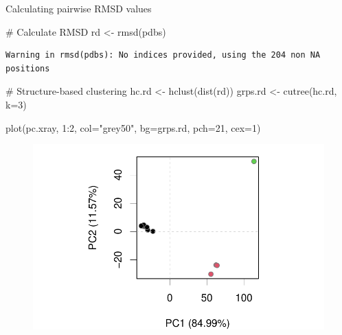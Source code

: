 \documentclass[
  letterpaper,
  DIV=11,
  numbers=noendperiod]{scrartcl}
\newenvironment{Shaded}{\begin{snugshade}}{\end{snugshade}}
\newcommand{\AttributeTok}[1]{\textcolor[rgb]{0.40,0.45,0.13}{#1}}
\newcommand{\CommentTok}[1]{\textcolor[rgb]{0.37,0.37,0.37}{#1}}
\newcommand{\DecValTok}[1]{\textcolor[rgb]{0.68,0.00,0.00}{#1}}
\newcommand{\FunctionTok}[1]{\textcolor[rgb]{0.28,0.35,0.67}{#1}}
\newcommand{\NormalTok}[1]{\textcolor[rgb]{0.00,0.23,0.31}{#1}}
\newcommand{\OtherTok}[1]{\textcolor[rgb]{0.00,0.23,0.31}{#1}}
\newcommand{\SpecialCharTok}[1]{\textcolor[rgb]{0.37,0.37,0.37}{#1}}
\newcommand{\StringTok}[1]{\textcolor[rgb]{0.13,0.47,0.30}{#1}}
\begin{document}
Calculating pairwise RMSD values

\begin{Shaded}
\begin{Highlighting}[]
\CommentTok{\# Calculate RMSD}
\NormalTok{rd }\OtherTok{\textless{}{-}} \FunctionTok{rmsd}\NormalTok{(pdbs)}
\end{Highlighting}
\end{Shaded}

\begin{verbatim}
Warning in rmsd(pdbs): No indices provided, using the 204 non NA positions
\end{verbatim}

\begin{Shaded}
\begin{Highlighting}[]
\CommentTok{\# Structure{-}based clustering}
\NormalTok{hc.rd }\OtherTok{\textless{}{-}} \FunctionTok{hclust}\NormalTok{(}\FunctionTok{dist}\NormalTok{(rd))}
\NormalTok{grps.rd }\OtherTok{\textless{}{-}} \FunctionTok{cutree}\NormalTok{(hc.rd, }\AttributeTok{k=}\DecValTok{3}\NormalTok{)}

\FunctionTok{plot}\NormalTok{(pc.xray, }\DecValTok{1}\SpecialCharTok{:}\DecValTok{2}\NormalTok{, }\AttributeTok{col=}\StringTok{"grey50"}\NormalTok{, }\AttributeTok{bg=}\NormalTok{grps.rd, }\AttributeTok{pch=}\DecValTok{21}\NormalTok{, }\AttributeTok{cex=}\DecValTok{1}\NormalTok{)}
\end{Highlighting}
\end{Shaded}

\begin{figure}[H]

{\centering \includegraphics{class09_files/figure-pdf/unnamed-chunk-16-1.pdf}

}

\end{figure}
\end{document}
